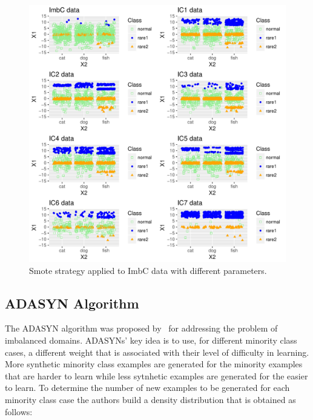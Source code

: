 \documentclass[10pt,a4paper]{article}\usepackage[]{graphicx}\usepackage[]{color}
\makeatletter
\def\maxwidth{ %
  \ifdim\Gin@nat@width>\linewidth
    \linewidth
  \else
    \Gin@nat@width
  \fi
}
\newenvironment{knitrout}{}{} %
\makeatother
\begin{document}
\begin{knitrout}\footnotesize
{}\color{fgcolor}\begin{figure}

{\centering \includegraphics[width=\maxwidth]{figures/UBL-smote_plot-1} 

}

\caption[Smote strategy applied to ImbC data with different parameters]{Smote strategy applied to ImbC data with different parameters.}\label{fig:smote_plot}
\end{figure}


\end{knitrout}


\subsection{ADASYN Algorithm}\label{sec:adasynClassif}

The ADASYN algorithm was proposed by~\cite{he2008adasyn} for addressing the problem of imbalanced domains. ADASYNs' key idea is to use, for different minority class cases, a different weight that is associated with their level of difficulty in learning. More synthetic minority class examples are generated for the minority examples that are harder to learn while less sytnhetic examples are generated for the easier to learn. To determine the number of new examples to be generated for each minority class case the authors build a density distribution that is obtained as follows:
\end{document}

